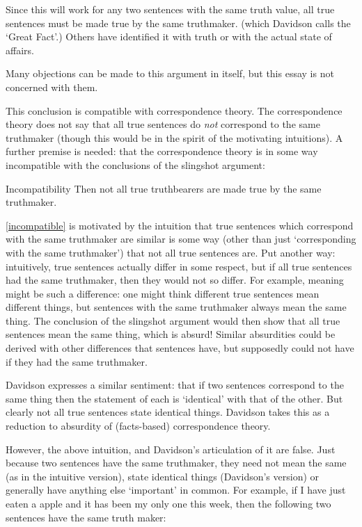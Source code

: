 Since this will work for any two sentences with the same truth value, all true sentences must be made true by the same truthmaker. (which Davidson calls the `Great Fact'.)
\parencite[753]{Davidson_1969}
Others have identified it with truth \parencite[216]{Frege_1948} or with the actual state of affairs. 

Many objections can be made to this argument in itself, but this essay is not concerned with them.

This conclusion is compatible with correspondence theory.
The correspondence theory does not say that all true sentences do \emph{not} correspond to the same truthmaker (though this would be in the spirit of the motivating intuitions).
A further premise is needed: that the correspondence theory is in some way incompatible with the conclusions of the slingshot argument:

	\begin{principle}{Incompatibility} \label{incompatible}
	Then not all true truthbearers are made true by the same truthmaker.
	\end{principle}

\ref{incompatible} is motivated by the intuition that true sentences which correspond with the same truthmaker are similar is some way (other than just `corresponding with the same truthmaker') that not all true sentences are.
Put another way: intuitively, true sentences actually differ in some respect, but if all true sentences had the same truthmaker, then they would not so differ.
For example, meaning might be such a difference: one might think different true sentences mean different things, but sentences with the same truthmaker always mean the same thing.
The conclusion of the slingshot argument would then show that all true sentences mean the same thing, which is absurd!
Similar absurdities could be derived with other differences that sentences have, but supposedly could not have if they had the same truthmaker.

Davidson expresses a similar sentiment: that if two sentences correspond to the same thing then the statement of each is `identical' with that of the other.
But clearly not all true sentences state identical things.
Davidson takes this as a reduction to absurdity of (facts-based) correspondence theory. %
\parencite[750]{Davidson_1969}

However, the above intuition, and Davidson's articulation of it are false.
Just because two sentences have the same truthmaker, they need not mean the same (as in the intuitive version), state identical things (Davidson's version) or generally have anything else `important' in common.
For example, if I have just eaten a apple and it has been my only one this week, then the following two sentences have the same truth maker:

